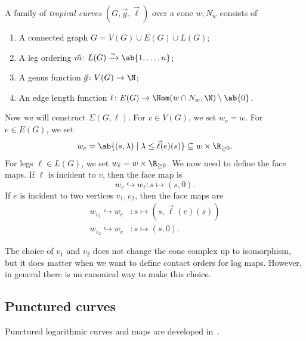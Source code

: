 \begin{defn}
    A family of \textit{tropical curves} \((G, \vec{g}, \vec{\ell})\) over a cone \(w, N_w\) consists of
    \begin{enumerate}
        \item A connected graph \(G = V(G) \cup E(G) \cup L(G)\);
        \item A leg ordering \(\vec{m} \colon L(G) \xrightarrow{\sim} \ab\{1, \ldots, n\}\);
        \item A genus function \(\vec{g} \colon V(G) \to \N\);
        \item An edge length function \(\ell \colon E(G) \to \Hom(w \cap N_w, \N) \setminus \ab\{0\}\).
    \end{enumerate}
\end{defn}

Now we will construct \(\Sigma(G, \ell)\). For \(v \in V(G)\), we set \(w_v = w\). For \(e \in E(G)\), we set
\[ w_e = \ab\{ (s, \lambda) \mid \lambda \leq \vec{\ell}(e)(s) \} \subseteq w \times \R_{\geq 0}. \]
For legs \(\ell \in L(G)\), we set \(w_{\ell} = w \times \R_{\geq 0}\). We now need to define the face maps. If \(\ell\) is incident to \(v\), then the face map is
\[ w_v \hookrightarrow w_{\ell} \colon s \mapsto (s, 0). \]
If \(e\) is incident to two vertices \(v_1, v_2\), then the face maps are
\begin{align*}
    w_{v_1} \hookrightarrow w_e &\colon s \mapsto (s, \vec{\ell}(e)(s)) \\
    w_{v_2} \hookrightarrow w_e & \colon s \mapsto (s, 0).
\end{align*}
\begin{rmk}
    The choice of \(v_1\) and \(v_2\) does not change the cone complex up to isomorphism, but it does matter when we want to define contact orders for log maps. However, in general there is no canonical way to make this choice.
\end{rmk}

\subsection{Punctured curves}%
\label{sub:Punctured curves}

Punctured logarithmic curves and maps are developed in~\cite{ACGS2025}.

